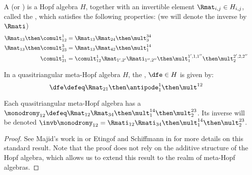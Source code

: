 \begin{definition}
A  (or ) is a Hopf algebra $H$, together with an invertible element $\Rmat_{i,j} \in
H_{i,j}$, called the , which satisfies the following
properties: (we will denote the inverse by $\Rmati$)
\begin{align}
        \label{eq:Rmat_understrand}
        \Rmat_{13}\then\comult^{1}_{12}&=\Rmat_{13}\Rmat_{24}\then\mult^{34}_3\\
        \label{eq:Rmat_overstrand}
        \Rmat_{13}\then\comult^{3}_{23}&=\Rmat_{13}\Rmat_{42}\then\mult^{14}_1\\
        \label{eq:Rmat_comult}
        \comult^{1}_{21} &=
                \comult^{1}_{12} \Rmat_{1',2'}\Rmati_{1'',2''}\then
                \mult^{1',1,1''}_{1}\then \mult^{2',2,2''}_{2}
\end{align}
\end{definition}

\begin{definition}
        In a quasitriangular meta-Hopf algebra $H$, the ,
        $\dfe \in H$ is given by:
        \begin{equation}
                \dfe \defeq \Rmat_{21}\then\antipode^1_1 \then \mult^{12}
        \end{equation}
\end{definition}

\begin{definition}[monodromy]
        Each quasitriangular meta-Hopf algebra has a 
        $\monodromy_{12} \defeq
        \Rmat_{12}\Rmat_{34}\then\mult^{14}_{1}\then\mult^{23}_{2}$. Its
        inverse will be denoted
        $\invb\monodromy_{12} =
        \Rmati_{12}\Rmati_{34}\then\mult^{14}_{1}\then\mult^{23}_{2}$.
\end{definition}

\begin{proof}
        See Majid's work in \cite{SM} or Etingof and Schiffmann in \cite{ES}
        for more details on this standard result. Note that the proof does not
        rely on the additive structure of the Hopf algebra, which allows us to
        extend this result to the realm of meta-Hopf algebras.
\end{proof}

